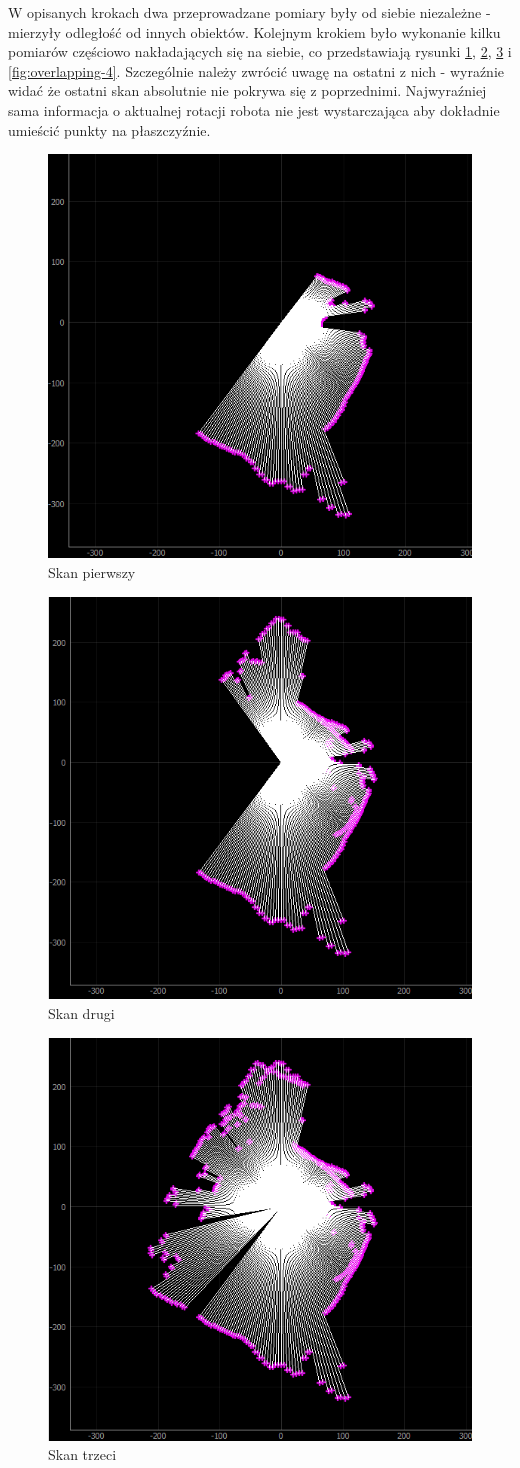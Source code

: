 W opisanych krokach dwa przeprowadzane pomiary były od siebie niezależne - mierzyły odległość od innych obiektów. Kolejnym krokiem było wykonanie kilku pomiarów częściowo nakładających się na siebie, co przedstawiają rysunki \ref{fig:overlapping-1}, \ref{fig:overlapping-2}, \ref{fig:overlapping-3} i \ref{fig:overlapping-4}. Szczególnie należy zwrócić uwagę na ostatni z nich - wyraźnie widać że ostatni skan absolutnie nie pokrywa się z poprzednimi. Najwyraźniej sama informacja o aktualnej rotacji robota nie jest wystarczająca aby dokładnie umieścić punkty na płaszczyźnie. 

\begin{figure}[ht]
	\centering
		\includegraphics[width=0.5\linewidth]{rys/ScanBot-12-calibrated-room-map1.PNG}
	\caption{Skan pierwszy}
	\label{fig:overlapping-1}
\end{figure}

\begin{figure}[ht]
	\centering
		\includegraphics[width=0.5\linewidth]{rys/ScanBot-12-calibrated-room-map2.PNG}
	\caption{Skan drugi}
	\label{fig:overlapping-2}
\end{figure}

\begin{figure}[ht]
	\centering
		\includegraphics[width=0.5\linewidth]{rys/ScanBot-12-calibrated-room-map3.PNG}
	\caption{Skan trzeci}
	\label{fig:overlapping-3}
\end{figure}

